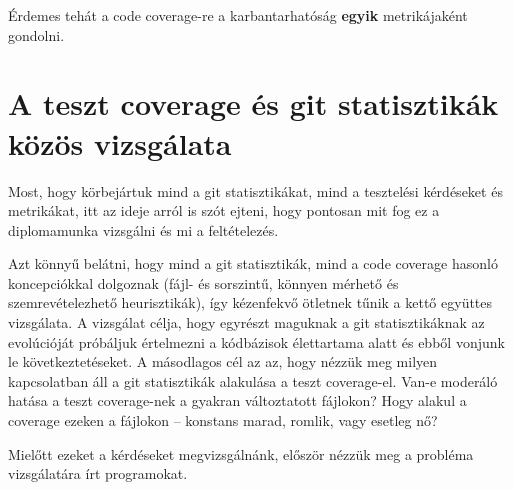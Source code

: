 Érdemes tehát a code coverage-re a karbantarhatóság \textbf{egyik} metrikájaként gondolni.

\section{A teszt coverage és git statisztikák közös vizsgálata}

Most, hogy körbejártuk mind a git statisztikákat, mind a tesztelési kérdéseket és metrikákat, itt az ideje arról is szót ejteni, hogy pontosan mit fog ez a diplomamunka vizsgálni és mi a feltételezés.

Azt könnyű belátni, hogy mind a git statisztikák, mind a code coverage hasonló koncepciókkal dolgoznak (fájl- és sorszintű, könnyen mérhető és szemrevételezhető heurisztikák), így kézenfekvő ötletnek tűnik a kettő együttes vizsgálata. A vizsgálat célja, hogy egyrészt maguknak a git statisztikáknak az evolúcióját próbáljuk értelmezni a kódbázisok élettartama alatt és ebből vonjunk le következtetéseket. A másodlagos cél az az, hogy nézzük meg milyen kapcsolatban áll a git statisztikák alakulása a teszt coverage-el. Van-e moderáló hatása a teszt coverage-nek a gyakran változtatott fájlokon? Hogy alakul a coverage ezeken a fájlokon -- konstans marad, romlik, vagy esetleg nő?

Mielőtt ezeket a kérdéseket megvizsgálnánk, először nézzük meg a probléma vizsgálatára írt programokat.